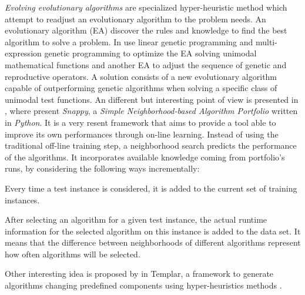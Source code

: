 \textit{Evolving evolutionary algorithms} are specialized hyper-heuristic method which attempt to readjust an evolutionary algorithm to the problem needs. An evolutionary algorithm (EA) discover the rules and knowledge to find the best algorithm to solve a problem. In \cite{Diosan2009}  use linear genetic programming and multi-expression genetic programming to optimize the EA solving unimodal mathematical functions and another EA to adjust the sequence of genetic and reproductive operators. A solution consists of a new evolutionary algorithm capable of outperforming genetic algorithms when solving a specific class of unimodal test functions. An different but interesting point of view is presented in \cite{Samulowitz2013}, where  present \textit{Snappy}, a \textit{Simple Neighborhood-based Algorithm Portfolio} written in \textit{Python}. It is a very resent framework that aims to provide a tool able to improve its own performances through on-line learning. Instead of using the traditional off-line training step, a neighborhood search predicts the performance of the algorithms. It incorporates available knowledge coming from portfolio's runs, by considering the following ways incrementally: \begin{inparaenum}[1-] \item Every time a test instance is considered, it is added to the current set of training instances. \item After selecting an algorithm for a given test instance, the actual runtime information for the selected algorithm on this instance is added to the data set. It means that the difference between neighborhoods of different algorithms represent how often algorithms will be selected. \end{inparaenum} Other interesting idea is proposed by  in {\sc Templar}, a framework to generate algorithms changing predefined components using hyper-heuristics methods \cite{Swan2015}.